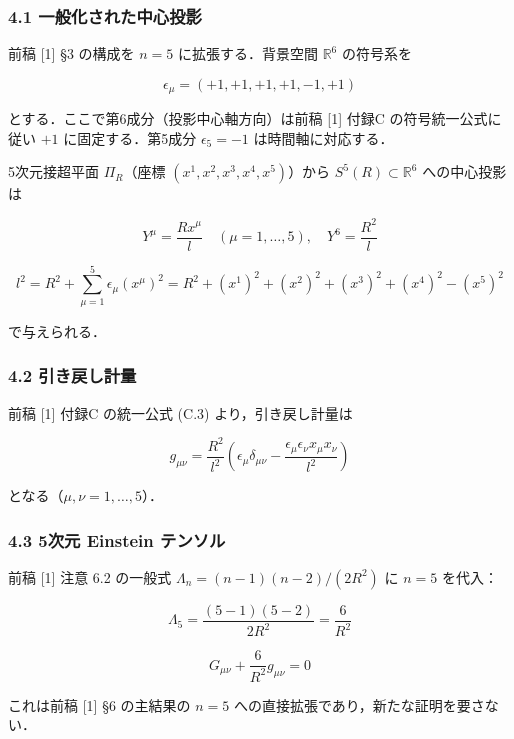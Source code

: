 \documentclass[a4paper,11pt]{ltjsarticle}
\theoremstyle{definition}
\begin{document}
\subsubsection{4.1 一般化された中心投影}\label{ux4e00ux822cux5316ux3055ux308cux305fux4e2dux5fc3ux6295ux5f71}

前稿 {[}1{]} §3 の構成を \(n=5\) に拡張する．背景空間 \(\mathbb{R}^6\) の符号系を

\[\epsilon_\mu = (+1, +1, +1, +1, -1, +1) \tag{4.1}\]

とする．ここで第6成分（投影中心軸方向）は前稿 {[}1{]} 付録C の符号統一公式に従い \(+1\) に固定する．第5成分 \(\epsilon_5 = -1\) は時間軸に対応する．

5次元接超平面 \(\Pi_R\)（座標 \((x^1, x^2, x^3, x^4, x^5)\)）から \(S^5(R) \subset \mathbb{R}^6\) への中心投影は

\[Y^\mu = \frac{Rx^\mu}{l} \quad (\mu = 1,\ldots,5), \quad Y^6 = \frac{R^2}{l} \tag{4.2}\]

\[l^2 = R^2 + \sum_{\mu=1}^{5} \epsilon_\mu (x^\mu)^2 = R^2 + (x^1)^2 + (x^2)^2 + (x^3)^2 + (x^4)^2 - (x^5)^2 \tag{4.3}\]

で与えられる．

\subsubsection{4.2 引き戻し計量}\label{ux5f15ux304dux623bux3057ux8a08ux91cf}

前稿 {[}1{]} 付録C の統一公式 (C.3) より，引き戻し計量は

\[g_{\mu\nu} = \frac{R^2}{l^2}\left(\epsilon_\mu \delta_{\mu\nu} - \frac{\epsilon_\mu \epsilon_\nu x_\mu x_\nu}{l^2}\right) \tag{4.4}\]

となる（\(\mu, \nu = 1,\ldots,5\)）．

\subsubsection{4.3 5次元 Einstein テンソル}\label{ux6b21ux5143-einstein-ux30c6ux30f3ux30bdux30eb}

前稿 {[}1{]} 注意 6.2 の一般式 \(\Lambda_n = (n-1)(n-2)/(2R^2)\) に \(n = 5\) を代入：

\[\Lambda_5 = \frac{(5-1)(5-2)}{2R^2} = \frac{6}{R^2} \tag{4.5}\]

\[G_{\mu\nu} + \frac{6}{R^2} g_{\mu\nu} = 0 \tag{4.6}\]

これは前稿 {[}1{]} §6 の主結果の \(n=5\) への直接拡張であり，新たな証明を要さない．
\end{document}
